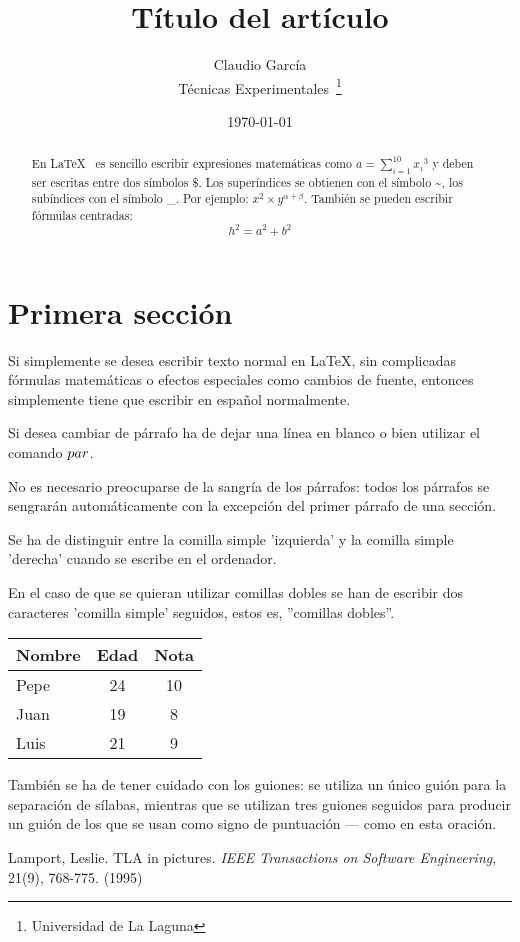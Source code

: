 \documentclass[a4paper,12pt]{article}
\begin{document}
\title{Título del artículo}
\author{Claudio García \\
        Técnicas Experimentales~\footnote{Universidad de La Laguna}
        }
\date{\today}
\maketitle
\begin{abstract}
  En \LaTeX{}~\cite{Lam:86} es sencillo escribir expresiones
  matemáticas como $a=\sum_{i=1}^{10} {x_i}^{3}$
  y deben ser escritas entre dos símbolos \$.
  Los superíndices se obtienen con el símbolo \~{},
  los subíndices con el símbolo \_.
  Por ejemplo: $x^2 \times y^{\alpha + \beta}$.
  También se pueden escribir fórmulas centradas:
  \[h^2=a^2 + b^2 \]
\end{abstract}

\section{Primera sección}
  
Si simplemente se desea escribir texto normal en LaTeX,
sin complicadas fórmulas matemáticas o efectos especiales
como cambios de fuente, entonces simplemente tiene que escribir
en español normalmente.
\par
Si desea cambiar de párrafo ha de dejar una línea en blanco o bien
utilizar el comando $\\par$.
\par
No es necesario preocuparse de la sangría de los párrafos:
todos los párrafos se sengrarán automáticamente con la excepción
del primer párrafo de una sección.

Se ha de distinguir entre la comilla simple 'izquierda'
y la comilla simple 'derecha' cuando se escribe en el ordenador.

En el caso de que se quieran utilizar comillas dobles se han de
escribir dos caracteres 'comilla simple' seguidos, estos es,
''comillas dobles''.

\bigskip
\begin{tabular}{|l|c|c|}
\hline
  Nombre & Edad & Nota \\ \hline
  Pepe   & 24   &   10 \\ \hline
  Juan   & 19   &    8 \\ \hline
  Luis   & 21   &    9 \\ \hline
\end{tabular}

También se ha de tener cuidado con los guiones: se utiliza un único
guión para la separación de sílabas, mientras que se utilizan
tres guiones seguidos para producir un guión de los que se usan
como signo de puntuación --- como en esta oración.

\begin{thebibliography}{00}
    Lamport, Leslie.
    TLA in pictures.
    \emph{IEEE Transactions on Software Engineering},
    21(9), 768-775.
    (1995)
  \end{thebibliography}
\end{document}

